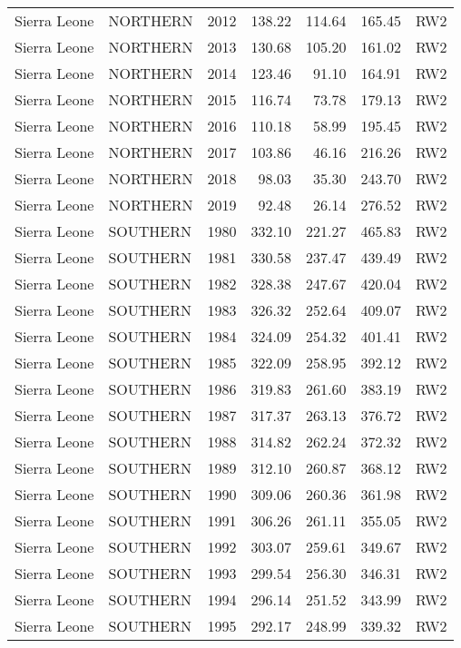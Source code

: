\begin{longtable}{lllrrrl}
  Sierra Leone & NORTHERN & 2012 & 138.22 & 114.64 & 165.45 & RW2 \\ 
  Sierra Leone & NORTHERN & 2013 & 130.68 & 105.20 & 161.02 & RW2 \\ 
  Sierra Leone & NORTHERN & 2014 & 123.46 & 91.10 & 164.91 & RW2 \\ 
  Sierra Leone & NORTHERN & 2015 & 116.74 & 73.78 & 179.13 & RW2 \\ 
  Sierra Leone & NORTHERN & 2016 & 110.18 & 58.99 & 195.45 & RW2 \\ 
  Sierra Leone & NORTHERN & 2017 & 103.86 & 46.16 & 216.26 & RW2 \\ 
  Sierra Leone & NORTHERN & 2018 & 98.03 & 35.30 & 243.70 & RW2 \\ 
  Sierra Leone & NORTHERN & 2019 & 92.48 & 26.14 & 276.52 & RW2 \\ 
  Sierra Leone & SOUTHERN & 1980 & 332.10 & 221.27 & 465.83 & RW2 \\ 
  Sierra Leone & SOUTHERN & 1981 & 330.58 & 237.47 & 439.49 & RW2 \\ 
  Sierra Leone & SOUTHERN & 1982 & 328.38 & 247.67 & 420.04 & RW2 \\ 
  Sierra Leone & SOUTHERN & 1983 & 326.32 & 252.64 & 409.07 & RW2 \\ 
  Sierra Leone & SOUTHERN & 1984 & 324.09 & 254.32 & 401.41 & RW2 \\ 
  Sierra Leone & SOUTHERN & 1985 & 322.09 & 258.95 & 392.12 & RW2 \\ 
  Sierra Leone & SOUTHERN & 1986 & 319.83 & 261.60 & 383.19 & RW2 \\ 
  Sierra Leone & SOUTHERN & 1987 & 317.37 & 263.13 & 376.72 & RW2 \\ 
  Sierra Leone & SOUTHERN & 1988 & 314.82 & 262.24 & 372.32 & RW2 \\ 
  Sierra Leone & SOUTHERN & 1989 & 312.10 & 260.87 & 368.12 & RW2 \\ 
  Sierra Leone & SOUTHERN & 1990 & 309.06 & 260.36 & 361.98 & RW2 \\ 
  Sierra Leone & SOUTHERN & 1991 & 306.26 & 261.11 & 355.05 & RW2 \\ 
  Sierra Leone & SOUTHERN & 1992 & 303.07 & 259.61 & 349.67 & RW2 \\ 
  Sierra Leone & SOUTHERN & 1993 & 299.54 & 256.30 & 346.31 & RW2 \\ 
  Sierra Leone & SOUTHERN & 1994 & 296.14 & 251.52 & 343.99 & RW2 \\ 
  Sierra Leone & SOUTHERN & 1995 & 292.17 & 248.99 & 339.32 & RW2 \\ 

\end{longtable}
